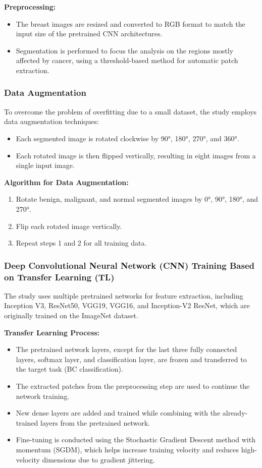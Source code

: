 \documentclass[12]{article}
\begin{document}
\textbf{Preprocessing:}
\begin{itemize}
    \item The breast images are resized and converted to RGB format to match the input size of the pretrained CNN architectures.
    \item Segmentation is performed to focus the analysis on the regions mostly affected by cancer, using a threshold-based method for automatic patch extraction.
\end{itemize}

\subsubsection{Data Augmentation}

To overcome the problem of overfitting due to a small dataset, the study employs data augmentation techniques:
\begin{itemize}
    \item Each segmented image is rotated clockwise by 90°, 180°, 270°, and 360°.
    \item Each rotated image is then flipped vertically, resulting in eight images from a single input image.
\end{itemize}

\textbf{Algorithm for Data Augmentation:}
\begin{enumerate}
    \item Rotate benign, malignant, and normal segmented images by 0°, 90°, 180°, and 270°.
    \item Flip each rotated image vertically.
    \item Repeat steps 1 and 2 for all training data.
\end{enumerate}

\subsubsection{Deep Convolutional Neural Network (CNN) Training Based on Transfer Learning (TL)}

The study uses multiple pretrained networks for feature extraction, including Inception V3, ResNet50, VGG19, VGG16, and Inception-V2 ResNet, which are originally trained on the ImageNet dataset.

\textbf{Transfer Learning Process:}
\begin{itemize}
    \item The pretrained network layers, except for the last three fully connected layers, softmax layer, and classification layer, are frozen and transferred to the target task (BC classification).
    \item The extracted patches from the preprocessing step are used to continue the network training.
    \item New dense layers are added and trained while combining with the already-trained layers from the pretrained network.
    \item Fine-tuning is conducted using the Stochastic Gradient Descent method with momentum (SGDM), which helps increase training velocity and reduces high-velocity dimensions due to gradient jittering.
\end{itemize}
\end{document}
